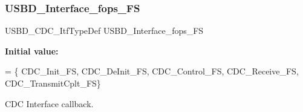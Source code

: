 \subsubsection{\texorpdfstring{U\+S\+B\+D\+\_\+\+Interface\+\_\+fops\+\_\+\+FS}{USBD\_Interface\_fops\_FS}}
{\footnotesize\ttfamily U\+S\+B\+D\+\_\+\+C\+D\+C\+\_\+\+Itf\+Type\+Def U\+S\+B\+D\+\_\+\+Interface\+\_\+fops\+\_\+\+FS}

{\bfseries Initial value\+:}
\begin{DoxyCode}
=
    \{
        CDC\_Init\_FS,
        CDC\_DeInit\_FS,
        CDC\_Control\_FS,
        CDC\_Receive\_FS,
        CDC\_TransmitCplt\_FS\}
\end{DoxyCode}
C\+DC Interface callback. 